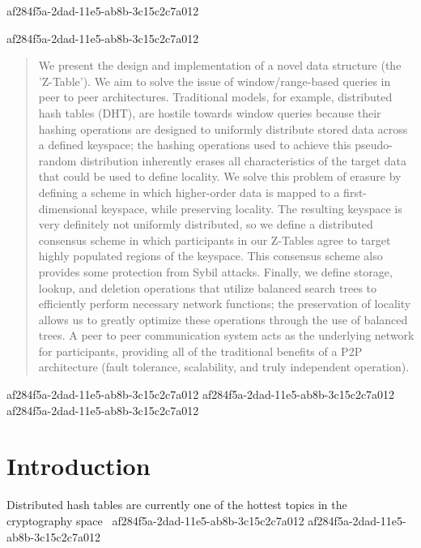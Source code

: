 \documentclass[12pt]{article}
\begin{document}
af284f5a-2dad-11e5-ab8b-3c15c2c7a012\maketitle
af284f5a-2dad-11e5-ab8b-3c15c2c7a012
\begin{abstract}
We present the design and implementation of a novel data structure (the 'Z-Table'). We aim to solve the issue of window/range-based queries in peer to peer architectures. Traditional models, for example,  distributed hash tables (DHT), are hostile towards window queries because their hashing operations are designed to uniformly distribute stored data across a defined keyspace; the hashing operations used to achieve this pseudo-random distribution inherently erases all characteristics of the target data that could be used to define locality. We solve this problem of erasure by defining a scheme in which higher-order data is mapped to a first-dimensional keyspace, while preserving locality. The resulting keyspace is very definitely not uniformly distributed, so we define a distributed consensus scheme in which participants in our Z-Tables agree to target highly populated regions of the keyspace. This consensus scheme also provides some protection from Sybil attacks. Finally, we define storage, lookup, and deletion operations that utilize balanced search trees to efficiently perform necessary network functions; the preservation of locality allows us to greatly optimize these operations through the use of balanced trees. A peer to peer communication system acts as the underlying network for participants, providing all of the traditional benefits of a P2P architecture (fault tolerance, scalability, and truly independent operation).
\end{abstract}
af284f5a-2dad-11e5-ab8b-3c15c2c7a012
af284f5a-2dad-11e5-ab8b-3c15c2c7a012
\newpage
af284f5a-2dad-11e5-ab8b-3c15c2c7a012\section{Introduction}
Distributed hash tables are currently one of the hottest topics in the cryptography space~\cite{Stoica:2001dj,Rowstron:2001ea,Ratnasamy:2001wn}
af284f5a-2dad-11e5-ab8b-3c15c2c7a012
\printbibliography
af284f5a-2dad-11e5-ab8b-3c15c2c7a012
\end{document}
